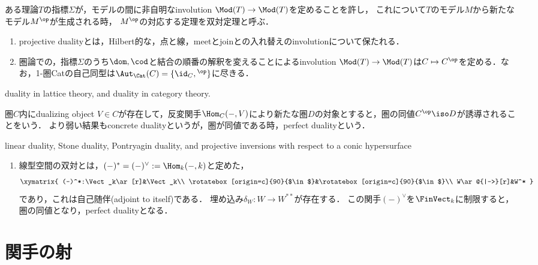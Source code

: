 \documentclass[uplatex,dvipdfmx]{jsreport}
\begin{document}
\begin{definition}\mbox{}
    ある理論$T$の指標$\Sigma$が，モデルの間に非自明なinvolution $\Mod(T)\to\Mod(T)$を定めることを許し，
    これについて$T$のモデル$M$から新たなモデル$M^\op$が生成される時，
    $M^\op$の対応する定理を双対定理と呼ぶ．
\end{definition}
\begin{example}\mbox{}
    \begin{enumerate}
        \item projective dualityとは，Hilbert的な，点と線，meetとjoinとの入れ替えのinvolutionについて保たれる．
        \item 圏論での，指標$\Sigma$のうち$\dom,\cod$と結合の順番の解釈を変えることによるinvolution $\Mod(T)\to\Mod(T)$は$C\mapsto C^\op$を定める．なお，1-圏Catの自己同型は$\Aut_\Cat(C)=\{\id_C,{}^\op\}$に尽きる．
    \end{enumerate}
    duality in lattice theory, and duality in category theory.
\end{example}

\begin{definition}
    圏$C$内にdualizing object $V\in C$が存在して，反変関手$\Hom_C(-,V)$により新たな圏$D$の対象とすると，圏の同値$C^\op\iso D$が誘導されることをいう．
    より弱い結果もconcrete dualityというが，圏が同値である時，perfect dualityという．
\end{definition}
\begin{example}\mbox{}
    linear duality, Stone duality, Pontryagin duality, and projective inversions with respect to a conic hypersurface
    \begin{enumerate}
        \item 線型空間の双対とは，$(-)^*=(-)^\vee:=\Hom_k(-,k)$と定めた，
        \[\xymatrix{
            (-)^*:\Vect_k\ar[r]&\Vect_k\\
            \rotatebox[origin=c]{90}{$\in$}&\rotatebox[origin=c]{90}{$\in$}\\
            W\ar@{|->}[r]&W^*
        }\]
        であり，これは自己随伴(adjoint to itself)である．
        埋め込み$\delta_W:W\to W^{**}$が存在する．
        この関手$(-)^\vee$を$\FinVect_k$に制限すると，圏の同値となり，perfect dualityとなる．
    \end{enumerate}
\end{example}

\section{関手の射}
\end{document}
